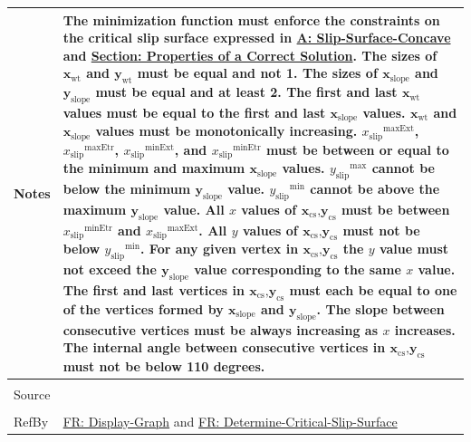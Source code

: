 \documentclass[12pt]{article}
\begin{document}
\begin{minipage}{\textwidth}
\begin{tabular}{>{\raggedright}p{}>{\raggedright\arraybackslash}p{}}
Notes & The minimization function must enforce the constraints on the critical slip surface expressed in \hyperref[assumpSSC]{A: Slip-Surface-Concave} and \hyperref[Sec:CorSolProps]{Section: Properties of a Correct Solution}. The sizes of ${\mathbf{x}_{\text{wt}}}$ and ${\mathbf{y}_{\text{wt}}}$ must be equal and not 1. The sizes of ${\mathbf{x}_{\text{slope}}}$ and ${\mathbf{y}_{\text{slope}}}$ must be equal and at least 2. The first and last ${\mathbf{x}_{\text{wt}}}$ values must be equal to the first and last ${\mathbf{x}_{\text{slope}}}$ values. ${\mathbf{x}_{\text{wt}}}$ and ${\mathbf{x}_{\text{slope}}}$ values must be monotonically increasing. ${{x_{\text{slip}}}^{\text{maxExt}}}$, ${{x_{\text{slip}}}^{\text{maxEtr}}}$, ${{x_{\text{slip}}}^{\text{minExt}}}$, and ${{x_{\text{slip}}}^{\text{minEtr}}}$ must be between or equal to the minimum and maximum ${\mathbf{x}_{\text{slope}}}$ values. ${{y_{\text{slip}}}^{\text{max}}}$ cannot be below the minimum ${\mathbf{y}_{\text{slope}}}$ value. ${{y_{\text{slip}}}^{\text{min}}}$ cannot be above the maximum ${\mathbf{y}_{\text{slope}}}$ value. All $x$ values of ${\mathbf{x}_{\text{cs}}}\text{,}{\mathbf{y}_{\text{cs}}}$ must be between ${{x_{\text{slip}}}^{\text{minEtr}}}$ and ${{x_{\text{slip}}}^{\text{maxExt}}}$. All $y$ values of ${\mathbf{x}_{\text{cs}}}\text{,}{\mathbf{y}_{\text{cs}}}$ must not be below ${{y_{\text{slip}}}^{\text{min}}}$. For any given vertex in ${\mathbf{x}_{\text{cs}}}\text{,}{\mathbf{y}_{\text{cs}}}$ the $y$ value must not exceed the ${\mathbf{y}_{\text{slope}}}$ value corresponding to the same $x$ value. The first and last vertices in ${\mathbf{x}_{\text{cs}}}\text{,}{\mathbf{y}_{\text{cs}}}$ must each be equal to one of the vertices formed by ${\mathbf{x}_{\text{slope}}}$ and ${\mathbf{y}_{\text{slope}}}$. The slope between consecutive vertices must be always increasing as $x$ increases. The internal angle between consecutive vertices in ${\mathbf{x}_{\text{cs}}}\text{,}{\mathbf{y}_{\text{cs}}}$ must not be below 110 degrees.
        
\\ \midrule \\
Source & \cite{li2010}
         
\\ \midrule \\
RefBy & \hyperref[displayGraph]{FR: Display-Graph} and \hyperref[determineCritSlip]{FR: Determine-Critical-Slip-Surface}
        
\\ \bottomrule
\end{tabular}
\end{minipage}
\end{document}
